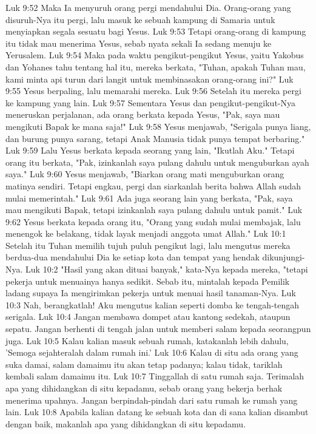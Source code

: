 Luk 9:52  Maka Ia menyuruh orang pergi mendahului Dia. Orang-orang yang disuruh-Nya itu pergi, lalu masuk ke sebuah kampung di Samaria untuk menyiapkan segala sesuatu bagi Yesus.
Luk 9:53  Tetapi orang-orang di kampung itu tidak mau menerima Yesus, sebab nyata sekali Ia sedang menuju ke Yerusalem.
Luk 9:54  Maka pada waktu pengikut-pengikut Yesus, yaitu Yakobus dan Yohanes tahu tentang hal itu, mereka berkata, "Tuhan, apakah Tuhan mau, kami minta api turun dari langit untuk membinasakan orang-orang ini?"
Luk 9:55  Yesus berpaling, lalu memarahi mereka.
Luk 9:56  Setelah itu mereka pergi ke kampung yang lain.
Luk 9:57  Sementara Yesus dan pengikut-pengikut-Nya meneruskan perjalanan, ada orang berkata kepada Yesus, "Pak, saya mau mengikuti Bapak ke mana saja!"
Luk 9:58  Yesus menjawab, "Serigala punya liang, dan burung punya sarang, tetapi Anak Manusia tidak punya tempat berbaring."
Luk 9:59  Lalu Yesus berkata kepada seorang yang lain, "Ikutlah Aku." Tetapi orang itu berkata, "Pak, izinkanlah saya pulang dahulu untuk menguburkan ayah saya."
Luk 9:60  Yesus menjawab, "Biarkan orang mati menguburkan orang matinya sendiri. Tetapi engkau, pergi dan siarkanlah berita bahwa Allah sudah mulai memerintah."
Luk 9:61  Ada juga seorang lain yang berkata, "Pak, saya mau mengikuti Bapak, tetapi izinkanlah saya pulang dahulu untuk pamit."
Luk 9:62  Yesus berkata kepada orang itu, "Orang yang sudah mulai membajak, lalu menengok ke belakang, tidak layak menjadi anggota umat Allah."
Luk 10:1  Setelah itu Tuhan memilih tujuh puluh pengikut lagi, lalu mengutus mereka berdua-dua mendahului Dia ke setiap kota dan tempat yang hendak dikunjungi-Nya.
Luk 10:2  "Hasil yang akan dituai banyak," kata-Nya kepada mereka, "tetapi pekerja untuk menuainya hanya sedikit. Sebab itu, mintalah kepada Pemilik ladang supaya Ia mengirimkan pekerja untuk menuai hasil tanaman-Nya.
Luk 10:3  Nah, berangkatlah! Aku mengutus kalian seperti domba ke tengah-tengah serigala.
Luk 10:4  Jangan membawa dompet atau kantong sedekah, ataupun sepatu. Jangan berhenti di tengah jalan untuk memberi salam kepada seorangpun juga.
Luk 10:5  Kalau kalian masuk sebuah rumah, katakanlah lebih dahulu, 'Semoga sejahteralah dalam rumah ini.'
Luk 10:6  Kalau di situ ada orang yang suka damai, salam damaimu itu akan tetap padanya; kalau tidak, tariklah kembali salam damaimu itu.
Luk 10:7  Tinggallah di satu rumah saja. Terimalah apa yang dihidangkan di situ kepadamu, sebab orang yang bekerja berhak menerima upahnya. Jangan berpindah-pindah dari satu rumah ke rumah yang lain.
Luk 10:8  Apabila kalian datang ke sebuah kota dan di sana kalian disambut dengan baik, makanlah apa yang dihidangkan di situ kepadamu.
